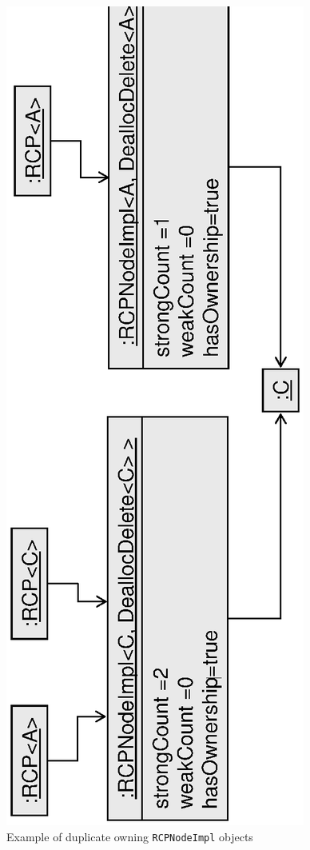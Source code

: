 \documentclass[pdf,ps2pdf,11pt]{SANDreport}
\begin{document}
{\begin{figure}
\begin{center}
\includegraphics*[angle=270,scale=0.65]{RCPEx2}
\end{center}
\caption{
\label{fig:RCPEx2}
Example of duplicate owning {}\texttt{RCPNodeImpl} objects}
\end{figure}
\esinglespace}
\end{document}
